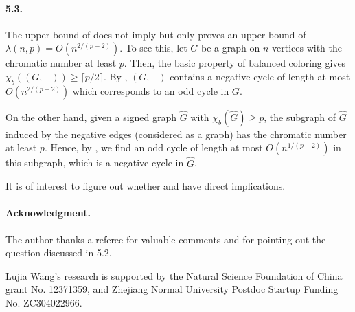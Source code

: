 \documentclass{article}
\begin{document}
\paragraph{5.3.} The upper bound of  does not imply  but only proves an upper bound of $\lambda(n,p)=O(n^{2/(p-2)})$. To see this, let $G$ be a graph on $n$ vertices with the chromatic number at least $p$. Then, the basic property of balanced coloring gives $\chi_b((G,-))\geq \lceil p/2\rceil$. By , $(G,-)$ contains a negative cycle of length at most $O(n^{2/(p-2)})$ which corresponds to an odd cycle in $G$.

On the other hand, given a signed graph $\widehat{G}$ with $\chi_b(\widehat{G})\geq p$, the subgraph of $\widehat{G}$ induced by the negative edges (considered as a graph) has the chromatic number at least $p$. Hence, by , we find an odd cycle of length at most $O(n^{1/{(p-2)}})$ in this subgraph, which is a negative cycle in $\widehat{G}$.

It is of interest to figure out whether  and  have direct implications.

\paragraph{Acknowledgment.} The author thanks a referee for valuable comments and for pointing out the question discussed in 5.2. 

Lujia Wang's research is supported by the Natural Science Foundation of China grant No. 12371359, and Zhejiang Normal University Postdoc Startup Funding No. ZC304022966.


\end{document}
